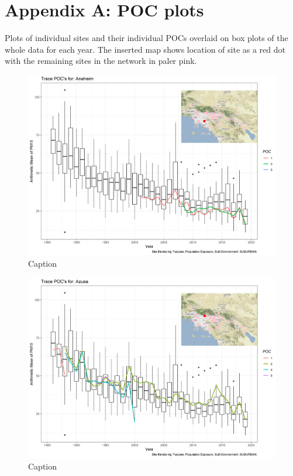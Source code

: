 \section{Appendix A: POC plots}
Plots of individual sites and their individual POCs overlaid on box plots of the whole data for each year.   The inserted map shows location of site as a red dot with the remaining sites in the network in paler pink.

\begin{figure}
    \centering
    \includegraphics[width = \textwidth]{Figures/IndividualSiteTraces/TracePOC_Anaheim.png}
    \caption{Caption}
    \label{fig:my_label}
\end{figure}

\begin{figure}
    \centering
    \includegraphics[width = \textwidth]{Figures/IndividualSiteTraces/TracePOC_Azusa.png}
    \caption{Caption}
    \label{fig:my_label}
\end{figure}

